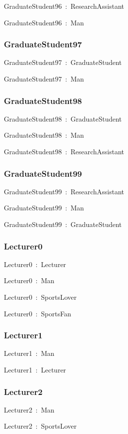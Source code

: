 \documentclass{article}
\begin{document}
GraduateStudent96~:~ResearchAssistant

GraduateStudent96~:~Man

\subsubsection*{GraduateStudent97}

GraduateStudent97~:~GraduateStudent

GraduateStudent97~:~Man

\subsubsection*{GraduateStudent98}

GraduateStudent98~:~GraduateStudent

GraduateStudent98~:~Man

GraduateStudent98~:~ResearchAssistant

\subsubsection*{GraduateStudent99}

GraduateStudent99~:~ResearchAssistant

GraduateStudent99~:~Man

GraduateStudent99~:~GraduateStudent

\subsubsection*{Lecturer0}

Lecturer0~:~Lecturer

Lecturer0~:~Man

Lecturer0~:~SportsLover

Lecturer0~:~SportsFan

\subsubsection*{Lecturer1}

Lecturer1~:~Man

Lecturer1~:~Lecturer

\subsubsection*{Lecturer2}

Lecturer2~:~Man

Lecturer2~:~SportsLover
\end{document}
